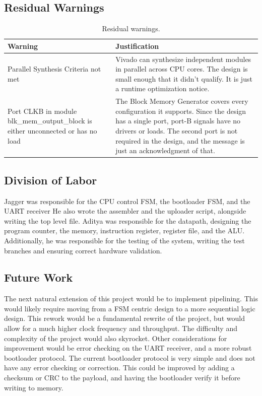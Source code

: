 \documentclass[11pt,letterpaper]{article}
\begin{document}
\subsection{Residual Warnings}
\begin{table}[H]
  \centering
  \begin{tabular}{@{}p{}p{}@{}}
    \toprule
    \textbf{Warning} & \textbf{Justification} \\
    \midrule
    Parallel Synthesis Criteria not met & Vivado can synthesize independent modules in parallel across CPU cores. The design is small enough that it didn't qualify. It is just a runtime optimization notice. \\

    Port CLKB in module blk\_mem\_output\_block is either unconnected or has no load & The Block Memory Generator covers every configuration it supports. Since the design has a single port, port-B signals have no drivers or loads. The second port is not required in the design, and the message is just an acknowledgment of that. \\
    \bottomrule
  \end{tabular}
  \caption{Residual warnings.}
\end{table}

\subsection{Division of Labor}
Jagger was responsible for the CPU control FSM, the bootloader FSM, and the UART receiver
He also wrote the assembler and the uploader script, alongside writing the top level file. Aditya was responsible for the datapath, designing the program counter, the memory, instruction register, register file, and the ALU. Additionally, he was responsible for the testing of the system, writing the test branches and ensuring correct hardware validation.


\subsection{Future Work}
The next natural extension of this project would be to implement pipelining. This would likely require moving
from a FSM centric design to a more sequential logic design. This rework would be a fundamental rewrite of the project,
but would allow for a much higher clock frequency and throughput. The difficulty and complexity of the project would also skyrocket.
Other considerations for improvement would be error checking on the UART receiver, and a more robust bootloader protocol. 
The current bootloader protocol is very simple and does not have any error checking or correction. 
This could be improved by adding a checksum or CRC to the payload, and having the bootloader verify it 
before writing to memory.
\end{document}

